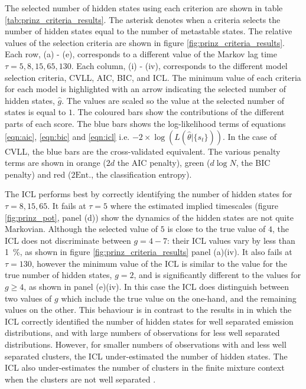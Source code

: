 The selected number of hidden states using each criterion are shown in table \ref{tab:prinz_criteria_results}. The asterisk denotes when a criteria selects the number of hidden states equal to the number of metastable states. The relative values of the selection criteria are shown in figure \ref{fig:prinz_criteria_results}. Each row, (a) - (e), corresponds to a different value of the Markov lag time $\tau=5, 8, 15, 65, 130$. Each column, (i) - (iv), corresponds to the different model selection criteria, CVLL, AIC, BIC, and ICL. The minimum value of each criteria for each model is highlighted with an arrow indicating the selected number of hidden states, $\hat{g}$. The values are scaled so the value at the selected number of states is equal to $1$.  The coloured bars show the contributions of the different parts of each score. The blue bars shows the log-likelihood terms of equations \ref{eqn:aic}, \ref{eqn:bic} and \ref{eqn:icl} i.e.  $-2\times \log{\left(L(\hat{\theta}|\{s_t\})\right)}$. In the case of CVLL, the blue bars are the  cross-validated equivalent. The various penalty terms are shown in orange ($2d$ the AIC penalty), green ($d\log{N}$, the BIC penalty) and red ($2\mathrm{Ent.}$, the classification entropy). 

The ICL performs best by correctly identifying the number of hidden states for $\tau=8, 15, 65$. It fails at $\tau=5$ where the estimated implied timescales (figure \ref{fig:prinz_pot}, panel (d)) show the dynamics of the hidden states are not quite Markovian. Although the selected value of $5$ is close to the true value of $4$, the ICL does not discriminate between $g=4 - 7$: their ICL values vary by less than \SI{1}{\percent}, as shown in figure \ref{fig:prinz_criteria_results} panel (a)(iv). It also fails at $\tau=130$, however the minimum value of the ICL is similar to the value for the true number of hidden states, $g = 2$, and is significantly different to the values for $g \ge 4$,  as shown in panel (e)(iv). In this case the ICL does distinguish between two  values of $g$ which include the true value on the one-hand, and the remaining values on the other. This behaviour is in contrast to the results in \cite{celeuxSelectingHiddenMarkov2008} in which the ICL correctly identified the number of hidden states for well separated emission distributions, and with large numbers of observations for less well separated distributions. However, for smaller numbers of observations with and less well separated clusters, the ICL under-estimated the number of hidden states. The ICL also under-estimates the number of clusters in the finite mixture context when the clusters are not well separated \cite{biernackiAssessingMixtureModel2000a}. 

